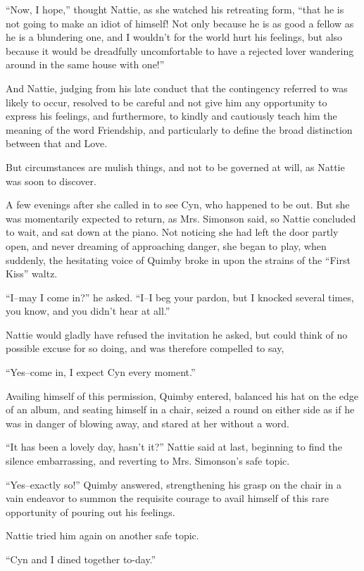 ``Now, I hope,'' thought Nattie, as she watched his retreating form, ``that
he is not going to make an idiot of himself! Not only because he is as
good a fellow as he is a blundering one, and I wouldn't for the world
hurt his feelings, but also because it would be dreadfully uncomfortable
to have a rejected lover wandering around in the same house with one!''

And Nattie, judging from his late conduct that the contingency referred
to was likely to occur, resolved to be careful and not give him any
opportunity to express his feelings, and furthermore, to kindly and
cautiously teach him the meaning of the word Friendship, and
particularly to define the broad distinction between that and Love.

But circumstances are mulish things, and not to be governed at will, as
Nattie was soon to discover.

A few evenings after she called in to see Cyn, who happened to be out.
But she was momentarily expected to return, as Mrs. Simonson said, so
Nattie concluded to wait, and sat down at the piano. Not noticing she
had left the door partly open, and never dreaming of approaching danger,
she began to play, when suddenly, the hesitating voice of Quimby broke
in upon the strains of the ``First Kiss'' waltz.

``I--may I come in?'' he asked. ``I--I beg your pardon, but I knocked
several times, you know, and you didn't hear at all.''

Nattie would gladly have refused the invitation he asked, but could
think of no possible excuse for so doing, and was therefore compelled to
say,

``Yes--come in, I expect Cyn every moment.''

Availing himself of this permission, Quimby entered, balanced his hat on
the edge of an album, and seating himself in a chair, seized a round on
either side as if he was in danger of blowing away, and stared at her
without a word.

``It has been a lovely day, hasn't it?'' Nattie said at last, beginning to
find the silence embarrassing, and reverting to Mrs. Simonson's safe
topic.

``Yes--exactly so!'' Quimby answered, strengthening his grasp on the chair
in a vain endeavor to summon the requisite courage to avail himself of
this rare opportunity of pouring out his feelings.

Nattie tried him again on another safe topic.

``Cyn and I dined together to-day.''

